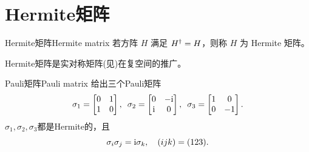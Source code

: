 \section{Hermite矩阵}

\begin{definition}{Hermite矩阵}{Hermite matrix}
	若方阵 $H$ 满足 $H^\dagger = H$，则称 $H$ 为 Hermite 矩阵。
\end{definition}
Hermite矩阵是实对称矩阵(见)在复空间的推广。

\begin{example}{Pauli矩阵}{Pauli matrix}
	给出三个Pauli矩阵
	\begin{equation}\label{eq:la-pauli-matrices}
		\sigma_1 =
		\begin{bmatrix}
			0&1\\1&0
		\end{bmatrix},\enspace
		\sigma_2 =
		\begin{bmatrix}
			0&-\mathrm{i}\\\mathrm{i}&0
		\end{bmatrix},\enspace
		\sigma_3 =
		\begin{bmatrix}
			1&0\\0&-1
		\end{bmatrix}.
	\end{equation}
	$\sigma_1,\sigma_2,\sigma_3$都是Hermite的，且
	\begin{equation}\label{eq:la-pauli-cyclic-product}
		\sigma_i\sigma_j = \mathrm{i}\sigma_k,\quad(ijk) = (123).
	\end{equation}
\end{example}

